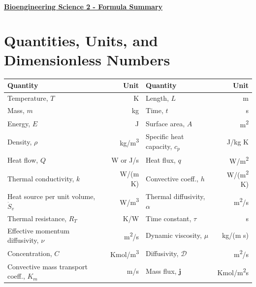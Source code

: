 \documentclass[11pt,a4paper]{article}
\begin{document}
\noindent 
{\Large\underline{\textbf{Bioengineering Science 2 - Formula Summary}}}
\section{Quantities, Units, and Dimensionless Numbers}
\begin{table}[H] 
\centering
\begin{tabularx}{.76\textwidth}{lrlr}
\toprule
\textbf{Quantity} & \textbf{Unit} & \textbf{Quantity} & \textbf{Unit} \\ 
\midrule
    Temperature, $T$ & 
    K & Length, $L$ & m \\ 
    Mass, $m$ & kg & 
    Time, $t$ & s  \\
    Energy, $E$ & J & 
    Surface area, $A$ & m\textsuperscript{2} \\ 
    Density, $\rho$ & kg/m\textsuperscript{3} & 
    Specific heat capacity, $c_{p}$ & J/kg K\\ 
    Heat flow, $Q$ & W or J/s  & 
    Heat flux, $q$ & W/m\textsuperscript{2} \\
    Thermal conductivity, $k$ & W/(m K) & 
    Convective coeff., $h$ & W/(m\textsuperscript{2} K)\\
    Heat source per unit volume, $\dot{S}_{v}$ & W/m\textsuperscript{3} & 
    Thermal diffusivity, $\alpha$ &  m\textsuperscript{2}/s \\ 
    
    Thermal resistance, $R_{T}$ & K/W & 
    Time constant, $\tau$ & s \\
    Effective momentum diffusivity, $\nu$ & m\textsuperscript{2}/s& 
    Dynamic viscosity, $\mu$ & kg/(m s) \\ 
    
    \midrule
    Concentration, $C$ & Kmol/m\textsuperscript{3} &
    Diffusivity, $\mathcal{D}$ & m\textsuperscript{2}/s \\ 
    Convective mass transport coeff., $K_{m}$ & m/s & 
    Mass flux, $\mathbf{j}$ & Kmol/m\textsuperscript{2}s\\ 
    \bottomrule
\end{tabularx}
\end{table}
\end{document}
